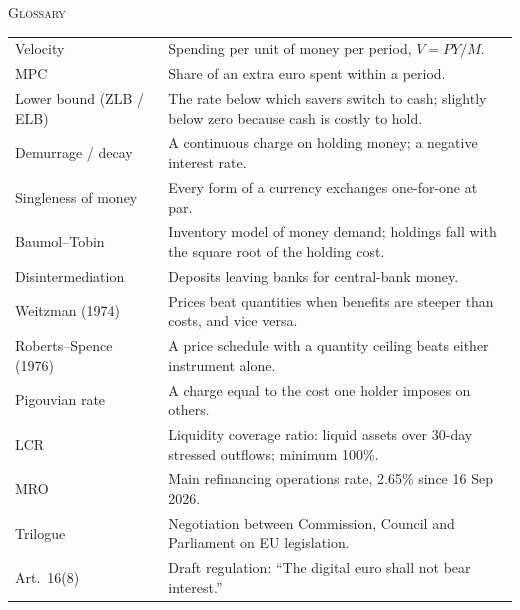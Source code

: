 \documentclass[a4paper,10pt]{article}
\newcommand{\kicker}[1]{{\footnotesize\scshape\color{accent}#1}}
\begin{document}
\vspace{0.8cm}
\kicker{Glossary}\par\medskip
\small
\begin{tabular}{@{}p{}p{}@{}}
  Velocity & Spending per unit of money per period, $V=PY/M$. \\
  MPC & Share of an extra euro spent within a period. \\
  Lower bound (ZLB / ELB) & The rate below which savers switch to cash; slightly below zero because cash is costly to hold. \\
  Demurrage / decay & A continuous charge on holding money; a negative interest rate. \\
  Singleness of money & Every form of a currency exchanges one-for-one at par. \\
  Baumol--Tobin & Inventory model of money demand; holdings fall with the square root of the holding cost. \\
  Disintermediation & Deposits leaving banks for central-bank money. \\
  Weitzman (1974) & Prices beat quantities when benefits are steeper than costs, and vice versa. \\
  Roberts--Spence (1976) & A price schedule with a quantity ceiling beats either instrument alone. \\
  Pigouvian rate & A charge equal to the cost one holder imposes on others. \\
  LCR & Liquidity coverage ratio: liquid assets over 30-day stressed outflows; minimum 100\%. \\
  MRO & Main refinancing operations rate, 2.65\% since 16 Sep 2026. \\
  Trilogue & Negotiation between Commission, Council and Parliament on EU legislation. \\
  Art.\ 16(8) & Draft regulation: ``The digital euro shall not bear interest.''
\end{tabular}
\end{document}

